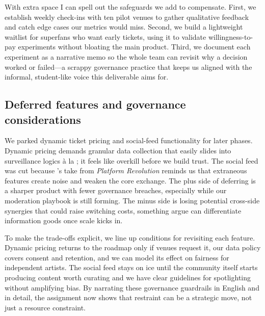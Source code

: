 With extra space I can spell out the safeguards we add to compensate. First, we establish weekly check-ins with ten pilot venues to gather qualitative feedback and catch edge cases our metrics would miss. Second, we build a lightweight waitlist for superfans who want early tickets, using it to validate willingness-to-pay experiments without bloating the main product. Third, we document each experiment as a narrative memo so the whole team can revisit why a decision worked or failed---a scrappy governance practice that keeps us aligned with the informal, student-like voice this deliverable aims for.

\subsection*{Deferred features and governance considerations}
We parked dynamic ticket pricing and social-feed functionality for later phases. Dynamic pricing demands granular data collection that easily slides into surveillance logics \`a la \citet{Zuboff2019}; it feels like overkill before we build trust. The social feed was cut because \citet{Choudary2016}'s take from \emph{Platform Revolution} reminds us that extraneous features create noise and weaken the core exchange. The plus side of deferring is a sharper product with fewer governance breaches, especially while our moderation playbook is still forming. The minus side is losing potential cross-side synergies that could raise switching costs, something \citet{ShapiroVarian1999} argue can differentiate information goods once scale kicks in.

To make the trade-offs explicit, we line up conditions for revisiting each feature. Dynamic pricing returns to the roadmap only if venues request it, our data policy covers consent and retention, and we can model its effect on fairness for independent artists. The social feed stays on ice until the community itself starts producing content worth curating and we have clear guidelines for spotlighting without amplifying bias. By narrating these governance guardrails in English and in detail, the assignment now shows that restraint can be a strategic move, not just a resource constraint.
